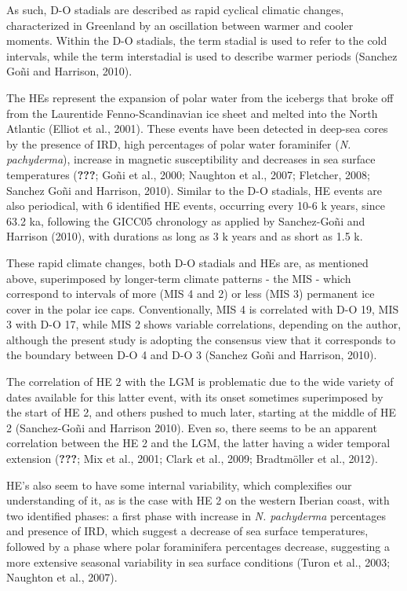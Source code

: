 \documentclass[12pt,twoside]{reedthesis}
\begin{document}
As such, D-O stadials are described as rapid cyclical climatic changes, characterized in Greenland by an oscillation between warmer and cooler moments. Within the D-O stadials, the term stadial is used to refer to the cold intervals, while the term interstadial is used to describe warmer periods (Sanchez Goñi and Harrison, 2010).

The HEs represent the expansion of polar water from the icebergs that broke off from the Laurentide Fenno-Scandinavian ice sheet and melted into the North Atlantic (Elliot et al., 2001). These events have been detected in deep-sea cores by the presence of IRD, high percentages of polar water foraminifer (\emph{N. pachyderma}), increase in magnetic susceptibility and decreases in sea surface temperatures ({\textbf{???}}; Goñi et al., 2000; Naughton et al., 2007; Fletcher, 2008; Sanchez Goñi and Harrison, 2010). Similar to the D-O stadials, HE events are also periodical, with 6 identified HE events, occurring every 10-6 k years, since 63.2 ka, following the GICC05 chronology as applied by Sanchez-Goñi and Harrison (2010), with durations as long as 3 k years and as short as 1.5 k.

These rapid climate changes, both D-O stadials and HEs are, as mentioned above, superimposed by longer-term climate patterns - the MIS - which correspond to intervals of more (MIS 4 and 2) or less (MIS 3) permanent ice cover in the polar ice caps. Conventionally, MIS 4 is correlated with D-O 19, MIS 3 with D-O 17, while MIS 2 shows variable correlations, depending on the author, although the present study is adopting the consensus view that it corresponds to the boundary between D-O 4 and D-O 3 (Sanchez Goñi and Harrison, 2010).

The correlation of HE 2 with the LGM is problematic due to the wide variety of dates available for this latter event, with its onset sometimes superimposed by the start of HE 2, and others pushed to much later, starting at the middle of HE 2 (Sanchez-Goñi and Harrison 2010). Even so, there seems to be an apparent correlation between the HE 2 and the LGM, the latter having a wider temporal extension ({\textbf{???}}; Mix et al., 2001; Clark et al., 2009; Bradtmöller et al., 2012).

HE's also seem to have some internal variability, which complexifies our understanding of it, as is the case with HE 2 on the western Iberian coast, with two identified phases: a first phase with increase in \emph{N. pachyderma} percentages and presence of IRD, which suggest a decrease of sea surface temperatures, followed by a phase where polar foraminifera percentages decrease, suggesting a more extensive seasonal variability in sea surface conditions (Turon et al., 2003; Naughton et al., 2007).
\end{document}
